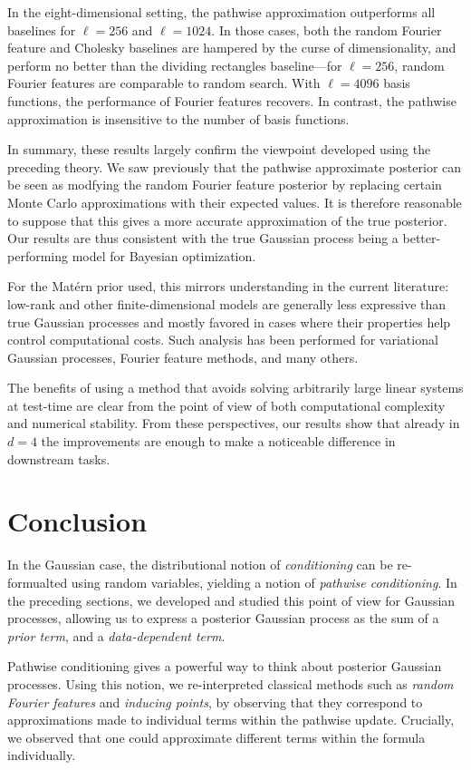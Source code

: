 \documentclass[11pt]{book}
\begin{document}
In the eight-dimensional setting, the pathwise approximation outperforms all baselines for $\ell = 256$ and $\ell = 1024$.
In those cases, both the random Fourier feature and Cholesky baselines are hampered by the curse of dimensionality, and perform no better than the dividing rectangles baseline---for $\ell = 256$, random Fourier features are comparable to random search.
With $\ell = 4096$ basis functions, the performance of Fourier features recovers.
In contrast, the pathwise approximation is insensitive to the number of basis functions.

In summary, these results largely confirm the viewpoint developed using the preceding theory.
We saw previously that the pathwise approximate posterior can be seen as modfying the random Fourier feature posterior by replacing certain Monte Carlo approximations with their expected values.
It is therefore reasonable to suppose that this gives a more accurate approximation of the true posterior.
Our results are thus consistent with the true Gaussian process being a better-performing model for Bayesian optimization.

For the Matérn prior used, this mirrors understanding in the current literature: low-rank and other finite-dimensional models are generally less expressive than true Gaussian processes and mostly favored in cases where their properties help control computational costs.
Such analysis has been performed for variational Gaussian processes, Fourier feature methods, and many others.

The benefits of using a method that avoids solving arbitrarily large linear systems at test-time are clear from the point of view of both computational complexity and numerical stability.
From these perspectives, our results show that already in $d=4$ the improvements are enough to make a noticeable difference in downstream tasks.


\section{Conclusion}

In the Gaussian case, the distributional notion of \emph{conditioning} can be re-formualted using random variables, yielding a notion of \emph{pathwise conditioning}.
In the preceding sections, we developed and studied this point of view for Gaussian processes, allowing us to express a posterior Gaussian process as the sum of a \emph{prior term}, and a \emph{data-dependent term}.

Pathwise conditioning gives a powerful way to think about posterior Gaussian processes.
Using this notion, we re-interpreted classical methods such as \emph{random Fourier features} and \emph{inducing points}, by observing that they correspond to approximations made to individual terms within the pathwise update.
Crucially, we observed that one could approximate different terms within the formula individually.
\end{document}
